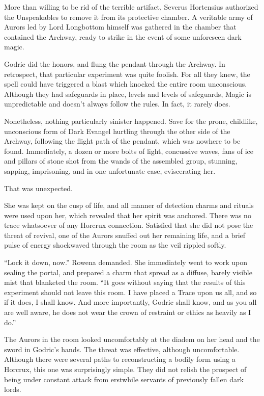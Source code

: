 More than willing to be rid of the terrible artifact, Severus Hortensius authorized the Unspeakables to remove it from its protective chamber. A veritable army of Aurors led by Lord Longbottom himself was gathered in the chamber that contained the Archway, ready to strike in the event of some unforeseen dark magic.

Godric did the honors, and flung the pendant through the Archway. In retrospect, that particular experiment was quite foolish. For all they knew, the spell could have triggered a blast which knocked the entire room unconscious. Although they had safeguards in place, levels and levels of safeguards, Magic is unpredictable and doesn’t always follow the rules. In fact, it rarely does.

Nonetheless, nothing particularly sinister happened. Save for the prone, childlike, unconscious form of Dark Evangel hurtling through the other side of the Archway, following the flight path of the pendant, which was nowhere to be found. Immediately, a dozen or more bolts of light, concussive waves, fans of ice and pillars of stone shot from the wands of the assembled group, stunning, sapping, imprisoning, and in one unfortunate case, eviscerating her.

That was unexpected.

She was kept on the cusp of life, and all manner of detection charms and rituals were used upon her, which revealed that her spirit was anchored. There was no trace whatsoever of any Horcrux connection. Satisfied that she did not pose the threat of revival, one of the Aurors snuffed out her remaining life, and a brief pulse of energy shockwaved through the room as the veil rippled softly.

“Lock it down, now.” Rowena demanded. She immediately went to work upon sealing the portal, and prepared a charm that spread as a diffuse, barely visible mist that blanketed the room. “It goes without saying that the results of this experiment should not leave this room. I have placed a Trace upon us all, and so if it does, I shall know. And more importantly, Godric shall know, and as you all are well aware, he does not wear the crown of restraint or ethics as heavily as I do.”

The Aurors in the room looked uncomfortably at the diadem on her head and the sword in Godric’s hands. The threat was effective, although uncomfortable. Although there were several paths to reconstructing a bodily form using a Horcrux, this one was surprisingly simple. They did not relish the prospect of being under constant attack from erstwhile servants of previously fallen dark lords.

